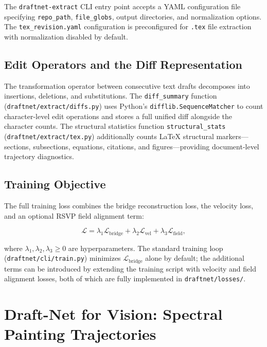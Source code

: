 \documentclass[12pt,a4paper]{article}
\theoremstyle{draftthm}
\newcommand{\code}[1]{\texttt{\small #1}}
\begin{document}
The \code{draftnet-extract} CLI entry point accepts a YAML configuration file specifying \code{repo\_path}, \code{file\_globs}, output directories, and normalization options. The \code{tex\_revision.yaml} configuration is preconfigured for \code{*.tex} file extraction with normalization disabled by default.

\subsection{Edit Operators and the Diff Representation}

The transformation operator between consecutive text drafts decomposes into insertions, deletions, and substitutions. The \code{diff\_summary} function (\code{draftnet/extract/diffs.py}) uses Python's \code{difflib.SequenceMatcher} to count character-level edit operations and stores a full unified diff alongside the character counts. The structural statistics function \code{structural\_stats} (\code{draftnet/extract/tex.py}) additionally counts \LaTeX{} structural markers---sections, subsections, equations, citations, and figures---providing document-level trajectory diagnostics.

\subsection{Training Objective}

The full training loss combines the bridge reconstruction loss, the velocity loss, and an optional RSVP field alignment term:

\begin{equation}
  \mathcal{L}
  =
  \lambda_1 \mathcal{L}_{\mathrm{bridge}}
  +
  \lambda_2 \mathcal{L}_{\mathrm{vel}}
  +
  \lambda_3 \mathcal{L}_{\mathrm{field}},
  \label{eq:combined-loss}
\end{equation}

where $\lambda_1, \lambda_2, \lambda_3 \geq 0$ are hyperparameters. The standard training loop (\code{draftnet/cli/train.py}) minimizes $\mathcal{L}_{\mathrm{bridge}}$ alone by default; the additional terms can be introduced by extending the training script with velocity and field alignment losses, both of which are fully implemented in \code{draftnet/losses/}.

\section{Draft-Net for Vision: Spectral Painting Trajectories}
\end{document}
